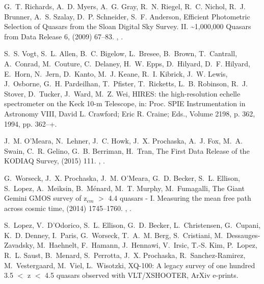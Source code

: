 \documentclass[12pt]{elsarticle}
\begin{document}
\begin{thebibliography}{10}
G.~T. {Richards}, A.~D. {Myers}, A.~G. {Gray}, R.~N. {Riegel}, R.~C. {Nichol},
  R.~J. {Brunner}, A.~S. {Szalay}, D.~P. {Schneider}, S.~F. {Anderson},
  {Efficient Photometric Selection of Quasars from the Sloan Digital Sky
  Survey. II. \~{}1,000,000 Quasars from Data Release 6},  (2009)
  67--83.
\newblock \href {http://arxiv.org/abs/0809.3952} {},
  \href {http://dx.doi.org/10.1088/0067-0049/180/1/67}
  {}.

S.~S. {Vogt}, S.~L. {Allen}, B.~C. {Bigelow}, L.~{Bresee}, B.~{Brown},
  T.~{Cantrall}, A.~{Conrad}, M.~{Couture}, C.~{Delaney}, H.~W. {Epps},
  D.~{Hilyard}, D.~F. {Hilyard}, E.~{Horn}, N.~{Jern}, D.~{Kanto}, M.~J.
  {Keane}, R.~I. {Kibrick}, J.~W. {Lewis}, J.~{Osborne}, G.~H. {Pardeilhan},
  T.~{Pfister}, T.~{Ricketts}, L.~B. {Robinson}, R.~J. {Stover}, D.~{Tucker},
  J.~{Ward}, M.~Z. {Wei}, {HIRES: the high-resolution echelle spectrometer on
  the Keck 10-m Telescope}, in: Proc. SPIE Instrumentation in Astronomy VIII,
  David L. Crawford; Eric R. Craine; Eds., Volume 2198, p. 362, 1994, pp.
  362--+.

J.~M. {O'Meara}, N.~{Lehner}, J.~C. {Howk}, J.~X. {Prochaska}, A.~J. {Fox},
  M.~A. {Swain}, C.~R. {Gelino}, G.~B. {Berriman}, H.~{Tran}, {The First Data
  Release of the KODIAQ Survey},  (2015) 111.
\newblock \href {http://arxiv.org/abs/1505.03529} {},
  \href {http://dx.doi.org/10.1088/0004-6256/150/4/111}
  {}.

G.~{Worseck}, J.~X. {Prochaska}, J.~M. {O'Meara}, G.~D. {Becker}, S.~L.
  {Ellison}, S.~{Lopez}, A.~{Meiksin}, B.~{M{\'e}nard}, M.~T. {Murphy},
  M.~{Fumagalli}, {The Giant Gemini GMOS survey of z$_{em}$ {$>$} 4.4 quasars -
  I. Measuring the mean free path across cosmic time},  (2014)
  1745--1760.
\newblock \href {http://arxiv.org/abs/1402.4154} {},
  \href {http://dx.doi.org/10.1093/mnras/stu1827}
  {}.

S.~{Lopez}, V.~{D'Odorico}, S.~L. {Ellison}, G.~D. {Becker}, L.~{Christensen},
  G.~{Cupani}, K.~D. {Denney}, I.~{Paris}, G.~{Worseck}, T.~A.~M. {Berg},
  S.~{Cristiani}, M.~{Dessauges-Zavadsky}, M.~{Haehnelt}, F.~{Hamann},
  J.~{Hennawi}, V.~{Irsic}, T.-S. {Kim}, P.~{Lopez}, R.~L. {Saust},
  B.~{Menard}, S.~{Perrotta}, J.~X. {Prochaska}, R.~{Sanchez-Ramirez},
  M.~{Vestergaard}, M.~{Viel}, L.~{Wisotzki}, {XQ-100: A legacy survey of one
  hundred 3.5 $<$ z $<$ 4.5 quasars observed with VLT/XSHOOTER}, ArXiv
  e-prints\href {http://arxiv.org/abs/1607.08776} {}.


\end{thebibliography}
\end{document}
